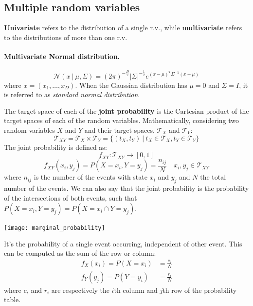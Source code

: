 \documentclass{article}
\begin{document}
\subsection{Multiple random variables}
\begin{definition}
    \textbf{Univariate} refers to the distribution of a single r.v., while
    \textbf{multivariate} refers to the distributions of more than one r.v.
\end{definition}
\paragraph{Multivariate Normal distribution.}
$$\mathcal{N}(x\ | \ \mu, \Sigma)=(2\pi)^{-\frac{D}{2}}\left\lvert
\Sigma\right\rvert^{-\frac{1}{2}}e^{(x-\mu)^T\Sigma^{-1}(x-\mu)}$$
where $x=(x_1,\ldots,x_D)$. When the Gaussian distribution has $\mu=0$ and
$\Sigma=I$, it is referred to as \textit{standard normal distribution}.
\begin{definition}
    The target space of each of the \textbf{joint probability} is the
    Cartesian product of the target spaces of each of the random variables.
    Mathematically, considering two random variables $X$ and $Y$ and their
    target spaces, $\mathcal{T}_X$ and $\mathcal{T}_Y$:
    $$\mathcal{T}_{XY}=\mathcal{T}_X\times \mathcal{T}_Y=\{(t_X,t_Y)\ |
    \ t_X\in\mathcal{T}_X,t_Y\in\mathcal{T}_Y\}$$
    The joint probability is defined as:
    $$f_{XY}:\mathcal{T}_{XY}\to[0,1]$$
    $$f_{XY}(x_i,y_j)=P(X=x_i,Y=y_j)=\frac{n_{ij}}{N}\quad x_i,y_j\in\mathcal{T}_{XY}$$
    where $n_{ij}$ is the number of the events with state $x_i$ and $y_j$ and
    $N$ the total number of the events.
    We can also say that the joint probability is the probability of the
    intersections of both events, such that $P(X=x_i,Y=y_j)=P(X=x_i\cap
    Y=y_j)$.
\end{definition}
\begin{center}
    \texttt{[image: marginal\_probability]}
\end{center}
\begin{definition} It's the probability of a single
    event occurring, independent of other event. This can be computed as the
    sum of the row or column: 
    $$
    \begin{aligned}
        f_X(x_i)=P(X=x_i)&=\frac{c_i}{N}\\
        f_Y(y_j)=P(Y=y_i)&=\frac{r_i}{N}
    \end{aligned}
    $$
    where $c_i$ and $r_i$ are respectively the $i$th column and $j$th row of the
    probability table.
\end{definition}
\end{document}
